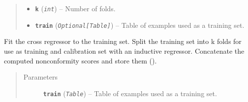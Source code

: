 \documentclass[letterpaper,10pt,english]{sphinxmanual}
\begin{document}
\begin{fulllineitems}
\begin{fulllineitems}
\begin{quote}
\begin{description}
\begin{itemize}
\item {} 
\textbf{\texttt{k}} (\emph{\texttt{int}}) -- Number of folds.

\item {} 
\textbf{\texttt{train}} (\emph{\texttt{Optional{[}Table{]}}}) -- Table of examples used as a training set.

\end{itemize}

\end{description}\end{quote}

\end{fulllineitems}


\begin{fulllineitems}
\label{cp.regression:cp.regression.CrossRegressor.fit}
Fit the cross regressor to the training set. Split the training set into k folds for use as
training and calibration set with an inductive regressor. Concatenate the computed nonconformity scores
and store them ({\hyperref[cp.regression:cp.regression.InductiveRegressor.alpha]{}}).
\begin{quote}\begin{description}
\item[{Parameters}] \leavevmode
\textbf{\texttt{train}} (\emph{\texttt{Table}}) -- Table of examples used as a training set.

\end{description}\end{quote}

\end{fulllineitems}


\end{fulllineitems}

\end{document}
